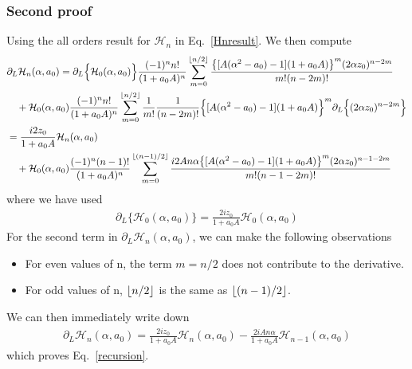 \documentclass[a4,letterpaper,11pt]{article}
\newcommand{\nn}{\nonumber}
\newcommand{\bea}{\begin{eqnarray}}
\newcommand{\eea}{\end{eqnarray}}
\newcommand{\cH}{\mathcal{H}}
\newcommand{\eq}[1]{Eq.~\eqref{#1}}
\DeclarePairedDelimiter\floor{\lfloor}{\rfloor}
\begin{document}
\subsubsection{Second proof}
Using the all orders result for $\mathcal{H}_n$ in \eq{Hnresult}.
We then compute 
\begin{align}
 &\partial_L\cH_n(\alpha,a_0) = \partial_L \Big\{\cH_0(\alpha,a_0) \Big\}\frac{(-1)^n n!}{(1+a_0 A)^n}\sum_{m=0}^{\floor*{n/2}}\frac{\bigl\{ [ A(\alpha^2 - a_0)-1] (1+a_0 A)\bigr\}^m (2\alpha z_0)^{n-2m}}{m!(n-2m)!} \nn \\
&\quad +  \cH_0(\alpha,a_0)\frac{(-1)^n n!}{(1+a_0 A)^n}\sum_{m=0}^{\floor*{n/2}}\frac{1}{m!}\frac{1}{(n-2m)!} \Bigl\{ [ A(\alpha^2 - a_0)-1] (1+a_0 A)\Bigr\}^m \partial_L \Big\{ (2\alpha z_0)^{n-2m}\Big\}\nn\\
&= \frac{ i 2z_0}{1+a_0 A}\cH_n(\alpha,a_0)\\
&\quad +  \cH_0(\alpha,a_0)\frac{(-1)^n (n-1)!}{(1+a_0 A)^n}\sum_{m=0}^{\floor*{(n-1)/2}}\frac{i 2An\alpha \bigl\{ [ A(\alpha^2 - a_0)-1] (1+a_0 A)\bigr\}^m  (2\alpha z_0)^{n-1-2m} }{m!(n-1-2m)!} \nn
\end{align}
where we have used 
\bea
 \partial_L \Big\{\cH_0(\alpha,a_0) \Big\} =  \frac{ 2i z_0}{1+a_0 A}\cH_0(\alpha,a_0)
\eea
For the second term in $\partial_L \cH_n(\alpha,a_0)$, we can make the following observations 
\begin{itemize}
\item 
For even values of n, the term $m =n/2$ does not contribute to the derivative.
\item
For odd values of n, $\floor*{n/2}$ is the same as $\floor*{(n-1)/2}$.
\end{itemize} 
We can then immediately write down 
\bea
 \partial_L\cH_n(\alpha,a_0)= \frac{2 i z_0}{1+a_0 A}\cH_n(\alpha,a_0) -\frac{ 2i A n \alpha }{1+a_0 A}\cH_{n-1}(\alpha,a_0)
\eea
which proves \eq{recursion}.



\end{document}
